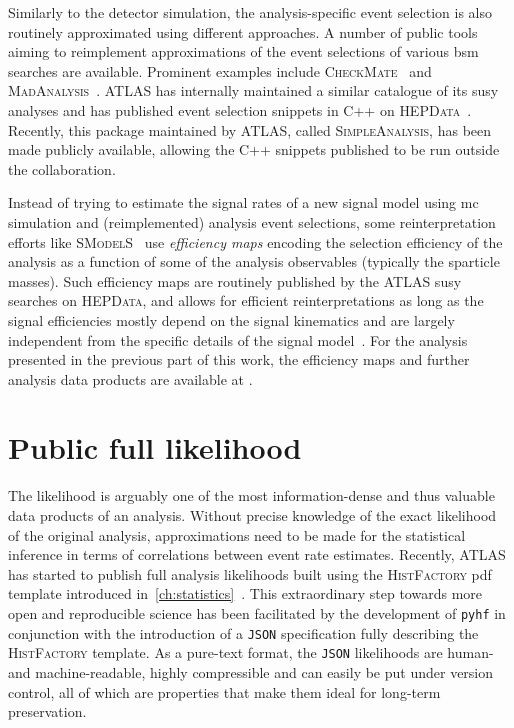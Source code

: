Similarly to the detector simulation, the analysis-specific event selection is also routinely approximated using different approaches. A number of public tools aiming to reimplement approximations of the event selections of various \gls{bsm} searches are available. Prominent examples include \textsc{CheckMate}~\cite{Checkmate2:2016npn,Checkmate:2013wra} and \textsc{MadAnalysis}~\cite{MadAnalysis:2012fm}. ATLAS has internally maintained a similar catalogue of its \gls{susy} analyses and has published event selection snippets in C++ on \textsc{HEPData}~\cite{HEPData:2017ypu}. Recently, this package maintained by ATLAS, called \textsc{SimpleAnalysis}, has been made publicly available, allowing the C++ snippets published to be run outside the collaboration.

Instead of trying to estimate the signal rates of a new signal model using \gls{mc} simulation and (reimplemented) analysis event selections, some reinterpretation efforts like \eg \textsc{SModelS}~\cite{SModelS1:2013mwa,SModelS2:2017neo} use \textit{efficiency maps} encoding the selection efficiency of the analysis as a function of some of the analysis observables (typically the sparticle masses). Such efficiency maps are routinely published by the ATLAS \gls{susy} searches on \textsc{HEPData}, and allows for efficient reinterpretations as long as the signal efficiencies mostly depend on the signal kinematics and are largely independent from the specific details of the signal model~\cite{SModelS1:2013mwa}. For the analysis presented in the previous part of this work, the efficiency maps and further analysis data products are available at \cite{HEPdata_1Lbb}. 

\section{Public full likelihood}\label{sec:full_likelihood}

The likelihood is arguably one of the most information-dense and thus valuable data products of an analysis. Without precise knowledge of the exact likelihood of the original analysis, approximations need to be made for the statistical inference \eg in terms of correlations between event rate estimates. Recently, ATLAS has started to publish full analysis likelihoods built using the \textsc{HistFactory} \gls{pdf} template introduced in~\cref{ch:statistics}~\cite{ATL-PHYS-PUB-2019-029}. This extraordinary step towards more open and reproducible science has been facilitated by the development of \texttt{pyhf} in conjunction with the introduction of a \texttt{JSON} specification fully describing the \textsc{HistFactory} template. As a pure-text format, the \texttt{JSON} likelihoods are human- and machine-readable, highly compressible and can easily be put under version control, all of which are properties that make them ideal for long-term preservation. 


